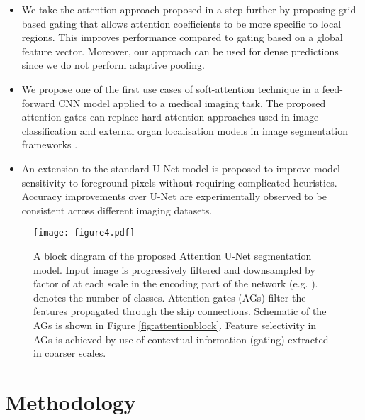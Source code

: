 \documentclass{article}
\begin{document}
\begin{itemize}
	
	\item We take the attention approach proposed in \cite{jetley2018learn} a step further by proposing grid-based gating that allows attention coefficients to be more specific to local regions. This improves performance compared to gating based on a global feature vector. Moreover, our approach can be used for dense predictions since we do not perform adaptive pooling.  
	
	\item We propose one of the first use cases of soft-attention technique in a feed-forward CNN model applied to a medical imaging task. The proposed attention gates can replace hard-attention approaches used in image classification \cite{ypsilantis2017learning} and external organ localisation models in image segmentation frameworks \cite{khened2018fully, oda20173d, roth2018media, roth2017hierarchical}. 
	
	\item An extension to the standard U-Net model is proposed to improve model sensitivity to foreground pixels without requiring complicated heuristics. Accuracy improvements over U-Net are experimentally observed to be consistent across different imaging datasets. 
\end{itemize}

\begin{figure}[!t]
	\centering
	\texttt{[image: figure4.pdf]}
	\caption{A block diagram of the proposed Attention U-Net segmentation model. Input image is progressively filtered and downsampled by factor of  at each scale in the encoding part of the network (e.g. ).  denotes the number of classes. Attention gates (AGs) filter the features propagated through the skip connections. Schematic of the AGs is shown in Figure \ref{fig:attentionblock}. Feature selectivity in AGs is achieved by use of contextual information (gating) extracted in coarser scales.}
	\label{fig:modelschematic}
\end{figure}

\section{Methodology}
\end{document}
